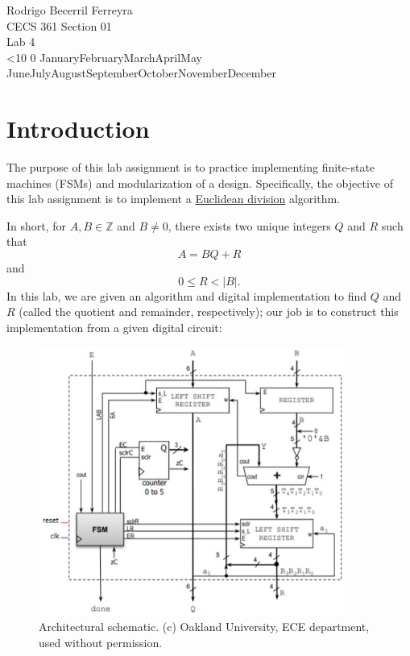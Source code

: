 \documentclass{article}
\renewcommand{\today}{\ifnum\number\day<10 0\fi \number\day \space%
\ifcase \month \or January\or February\or March\or April\or May%
\or June\or July\or August\or September\or October\or November\or December\fi\space%
\number \year}
\begin{document}
    \noindent
    Rodrigo Becerril Ferreyra\\
    CECS 361 Section 01\\
    Lab 4\\
    \today

\section{Introduction} The purpose of this lab
assignment
is to practice
implementing finite-state machines (FSMs) and modularization
of a design. Specifically, the objective of this lab assignment
is to implement a \href{https://en.wikipedia.org/wiki/Euclidean_division}
{Euclidean division} algorithm.

In short, for \(A, B \in \mathbb{Z}\) and \(B\ne0\),
there exists two unique integers \(Q\) and \(R\) such that
\begin{equation}
    A = BQ + R
\end{equation} and
\begin{equation}
    0 \le R < |B|.
\end{equation}In this lab, we are given an algorithm
and digital implementation
to find \(Q\) and \(R\) (called the quotient and remainder,
respectively); our job is to construct this implementation
from a given digital circuit:

\begin{figure}[H]
    \centering
    \includegraphics[height=250pt]{Images/circuit}
    \caption{Architectural schematic. (c) Oakland University, ECE department, used without permission.}
    \label{circuit}
\end{figure}
\end{document}
